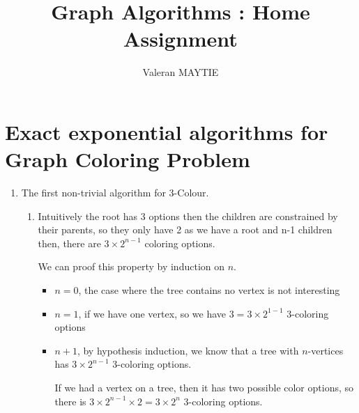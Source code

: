 \documentclass{article}
\title{Graph Algorithms : Home Assignment}
\author{Valeran MAYTIE}
\date{}
\theoremstyle{plain}
\begin{document}
  \maketitle

  \section*{Exact exponential algorithms for Graph Coloring Problem}

  \begin{enumerate}
    \item The first non-trivial algorithm for 3-Colour.
      \begin{enumerate}
        \item
          Intuitively the root has 3 options then the children are constrained by
          their parents, so they only have 2 as we have a root and n-1 children
          then, there are $3 \times 2^{n-1}$ coloring options.

         We can proof this property by induction on $n$.
          \begin{itemize}
            \item $n=0$, the case where the tree contains no vertex is not
              interesting

            \item $n=1$, if we have one vertex, so we have $3=3\times2^{1-1}$
              3-coloring options

            \item $n+1$, by hypothesis induction, we know that a tree with
              $n$-vertices has $3\times2^{n-1}$ 3-coloring options.

              If we had a vertex on a tree, then it has two possible color
              options, so there is $3\times2^{n-1}\times 2 = 3 \times 2^n$
              3-coloring options.
          \end{itemize}



\end{enumerate}
\end{enumerate}
\end{document}
